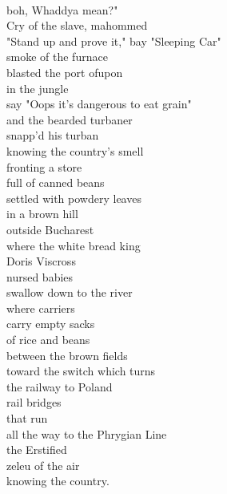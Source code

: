 \documentclass[smalldemyvopaper,11pt,twoside,onecolumn,openright,extrafontsizes]{memoir}
\begin{document}
\\boh, Whaddya mean?"
\\Cry of the slave, mahommed
\\"Stand up and prove it," bay "Sleeping Car"
\\smoke of the furnace
\\blasted the port ofupon
\\in the jungle
\\say "Oops it's dangerous to eat grain"
\\and the bearded turbaner
\\snapp'd his turban
\\knowing the country's smell
\\fronting a store
\\full of canned beans
\\settled with powdery leaves
\\in a brown hill
\\outside Bucharest
\\where the white bread king
\\Doris Viscross
\\nursed babies
\\swallow down to the river
\\where carriers
\\carry empty sacks
\\of rice and beans
\\between the brown fields
\\toward the switch which turns
\\the railway to Poland
\\rail bridges
\\that run
\\all the way to the Phrygian Line
\\the Erstified
\\zeleu of the air
\\knowing the country.
\end{document}
